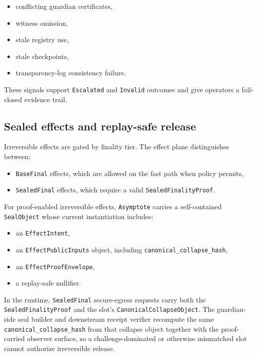 \documentclass[11pt]{article}
\newcommand{\code}[1]{\texttt{#1}}
\begin{document}
\begin{itemize}[leftmargin=1.5em]
\item conflicting guardian certificates,
\item witness omission,
\item stale registry use,
\item stale checkpoints,
\item transparency-log consistency failure.
\end{itemize}

These signals support \code{Escalated} and \code{Invalid} outcomes and give
operators a fail-closed evidence trail.

\subsection{Sealed effects and replay-safe release}

Irreversible effects are gated by finality tier. The effect plane
distinguishes between:

\begin{itemize}[leftmargin=1.5em]
\item \code{BaseFinal} effects, which are allowed on the fast path when policy
permits,
\item \code{SealedFinal} effects, which require a valid
\code{SealedFinalityProof}.
\end{itemize}

For proof-enabled irreversible effects, \code{Asymptote} carries a
self-contained \code{SealObject} whose current instantiation includes:

\begin{itemize}[leftmargin=1.5em]
\item an \code{EffectIntent},
\item an \code{EffectPublicInputs} object, including
  \code{canonical\_collapse\_hash},
\item an \code{EffectProofEnvelope},
\item a replay-safe nullifier.
\end{itemize}

In the runtime, \code{SealedFinal} secure-egress requests carry both
the \code{SealedFinalityProof} and the slot's
\code{CanonicalCollapseObject}. The guardian-side seal builder and downstream
receipt verifier recompute the same \code{canonical\_collapse\_hash} from that
collapse object together with the proof-carried observer surface, so a
challenge-dominated or otherwise mismatched slot cannot authorize irreversible
release.
\end{document}
